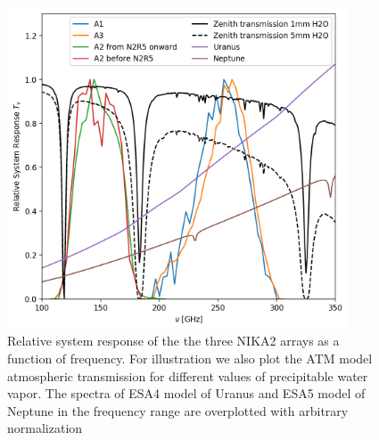 

\begin{figure}[ht] %
\begin{center}
\includegraphics[width=0.9\textwidth]{Figures/SpectralBands/bandpasses_nika2.png}
\caption{Relative system response of the the three NIKA2 arrays as a
  function of frequency. For illustration we also plot the ATM model
  atmospheric transmission for different values of precipitable water
  vapor. The spectra of ESA4 model of Uranus and ESA5 model of
  Neptune in the frequency range are overplotted with arbitrary
  normalization}
 \label{spectralband1}
\end{center}
\end{figure}



